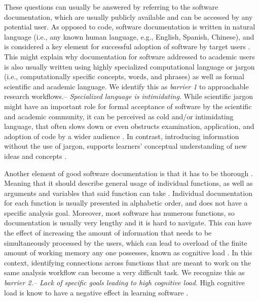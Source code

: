 \documentclass[12pt]{article}
\begin{document}
These questions can usually be answered by referring to the software documentation, which are usually publicly available and can be accessed by any potential user.
As opposed to code, software documentation is written in natural language (i.e., any known human language, e.g., English, Spanish, Chinese), and is considered a key element for successful adoption of software by target users \citep{karimzadeh2018top}. This might explain why documentation for software addressed to academic users is also usually written using highly specialized computational language or jargon (i.e., computationally specific concepts, words, and phrases) as well as formal scientific and academic language.
We identify this as \textit{barrier 1} to approachable research workflows.-- \textit{Specialized language is intimidating}.
While scientific jargon might have an important role for formal acceptance of software by the scientific and academic community, it can be perceived as cold and/or intimidating language, that often slows down or even obstructs examination, application, and adoption of code by a wider audience \citep{ball2017its}.
In contrast, introducing information without the use of jargon, supports learners' conceptual understanding of new ideas and concepts \citep{mcdonnell2016concepts, pan2019online}.

Another element of good software documentation is that it has to be thorough \citep{karimzadeh2018top}.
Meaning that it should describe general usage of individual functions, as well as arguments and variables that said function can take \citep{karimzadeh2018top}.
Individual documentation for each function is usually presented in alphabetic order, and does not have a specific analysis goal.
Moreover, most software has numerous functions, so documentation is usually very lengthy and it is hard to navigate.
This can have the effect of increasing the amount of information that needs to be simultaneously processed by the users, which can lead to overload of the finite amount of working memory any one possesses, known as cognitive load \citep{sweller1988cognitive}.
In this context, identifying connections across functions that are meant to work on the same analysis workflow can become a very difficult task.
We recognize this as \textit{barrier 2.-- Lack of specific goals leading to high cognitive load}.
High cognitive load is know to have a negative effect in learning software \citep{chandler1996cognitive, van2005research, lambert2009student}.
\end{document}
